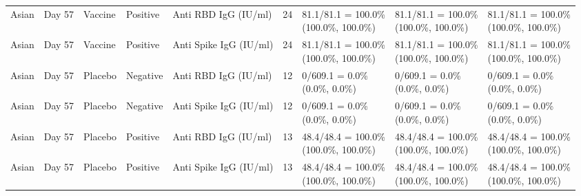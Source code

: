 \documentclass[]{book}
\theoremstyle{definition}
\theoremstyle{definition}
\theoremstyle{definition}
\newcommand{\1}{\mathbbm{1}}
\begin{document}
\begin{landscape}
\begin{ThreePartTable}
\begin{longtable}[t]{>{\raggedright\arraybackslash}p{2.7cm}llllllll}
\hspace{1em}Asian & Day 57 & Vaccine & Positive & Anti RBD IgG (IU/ml) & 24 & \makecell[l]{81.1/81.1 = 100.0\%\\(100.0\%, 100.0\%)} & \makecell[l]{81.1/81.1 = 100.0\%\\(100.0\%, 100.0\%)} & \makecell[l]{81.1/81.1 = 100.0\%\\(100.0\%, 100.0\%)}\\
\hspace{1em}Asian & Day 57 & Vaccine & Positive & Anti Spike IgG (IU/ml) & 24 & \makecell[l]{81.1/81.1 = 100.0\%\\(100.0\%, 100.0\%)} & \makecell[l]{81.1/81.1 = 100.0\%\\(100.0\%, 100.0\%)} & \makecell[l]{81.1/81.1 = 100.0\%\\(100.0\%, 100.0\%)}\\
\hspace{1em}Asian & Day 57 & Placebo & Negative & Anti RBD IgG (IU/ml) & 12 & \makecell[l]{0/609.1 = 0.0\%\\(0.0\%, 0.0\%)} & \makecell[l]{0/609.1 = 0.0\%\\(0.0\%, 0.0\%)} & \makecell[l]{0/609.1 = 0.0\%\\(0.0\%, 0.0\%)}\\
\hspace{1em}Asian & Day 57 & Placebo & Negative & Anti Spike IgG (IU/ml) & 12 & \makecell[l]{0/609.1 = 0.0\%\\(0.0\%, 0.0\%)} & \makecell[l]{0/609.1 = 0.0\%\\(0.0\%, 0.0\%)} & \makecell[l]{0/609.1 = 0.0\%\\(0.0\%, 0.0\%)}\\
\hspace{1em}Asian & Day 57 & Placebo & Positive & Anti RBD IgG (IU/ml) & 13 & \makecell[l]{48.4/48.4 = 100.0\%\\(100.0\%, 100.0\%)} & \makecell[l]{48.4/48.4 = 100.0\%\\(100.0\%, 100.0\%)} & \makecell[l]{48.4/48.4 = 100.0\%\\(100.0\%, 100.0\%)}\\
\hspace{1em}Asian & Day 57 & Placebo & Positive & Anti Spike IgG (IU/ml) & 13 & \makecell[l]{48.4/48.4 = 100.0\%\\(100.0\%, 100.0\%)} & \makecell[l]{48.4/48.4 = 100.0\%\\(100.0\%, 100.0\%)} & \makecell[l]{48.4/48.4 = 100.0\%\\(100.0\%, 100.0\%)}\\

\end{longtable}
\end{ThreePartTable}
\end{landscape}
\end{document}
